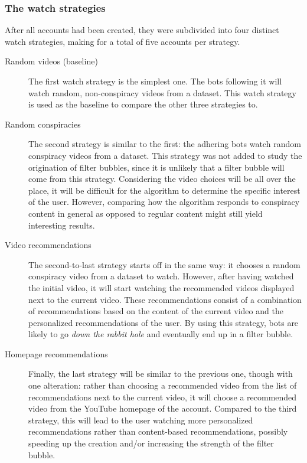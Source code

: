 \documentclass[../main.tex]{subfiles}
\begin{document}
\subsubsection{The watch strategies}
After all accounts had been created, they were subdivided into four distinct watch strategies, making for
a total of five accounts per strategy. 

\begin{description}
\item[Random videos (baseline)] The first watch strategy is the simplest one. The bots following 
it will watch random, non-conspiracy videos from a dataset. This watch strategy is used as the 
baseline to compare the other three strategies to.

\item[Random conspiracies] The second strategy is similar to the first: the 
adhering bots watch random conspiracy videos from a dataset. This strategy was not added to 
study the origination of filter bubbles, since it is unlikely that a filter bubble will come from this 
strategy. Considering the video choices will be all over the place, it will be difficult for the 
algorithm to determine the specific interest of the user. However, comparing how the algorithm 
responds to conspiracy content in general as opposed to regular content might still yield interesting 
results.


\item[Video recommendations] The second-to-last strategy starts off in the same way: it chooses a random 
conspiracy video from a dataset to watch. However, after having watched the initial video, it will start 
watching the recommended videos displayed next to the current video. These recommendations consist of a 
combination of recommendations based on the content of the current video and the personalized recommendations
of the user. By using this strategy, bots are likely to go \textit{down the rabbit hole} and eventually end 
up in a filter bubble.

\item[Homepage recommendations] Finally, the last strategy will be similar to the previous one, though with 
one alteration: rather than choosing a recommended video from the list of recommendations next to the current
video, it will choose a recommended video from the YouTube homepage of the account. Compared to the third
strategy, this will lead to the user watching more personalized recommendations rather than content-based
recommendations, possibly speeding up the creation and/or increasing the strength of the filter bubble.

\end{description}
\end{document}
